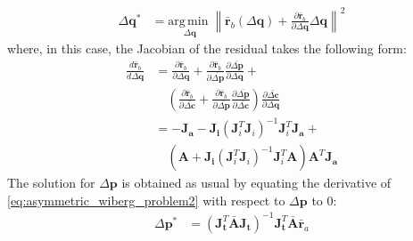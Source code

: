 \begin{equation}
    \begin{aligned}
        \Delta\mathbf{q}^* & = \underset{\Delta\mathbf{q}}{\mathrm{arg\,min\;}}  \left\| \bar{\mathbf{r}}_b(\Delta\mathbf{q}) + \frac{\partial \bar{\mathbf{r}}_b}{\partial\Delta\mathbf{q}} \Delta\mathbf{q} \right\|^2
    \label{eq:bidirectional_wiberg_problem2}
    \end{aligned}
\end{equation}
where, in this case, the Jacobian of the residual takes the following form:
\begin{equation}
    \begin{aligned}
        \frac{d \bar{\mathbf{r}}_b}{d \Delta \mathbf{q}} & = \frac{\partial \bar{\mathbf{r}}_b}{\partial \Delta \mathbf{q}} + \frac{\partial \bar{\mathbf{r}}_b}{\partial \bar{\Delta \mathbf{p}}} \frac{\partial \bar{\Delta \mathbf{p}}}{\partial \Delta \mathbf{q}} +
        \\
        & \quad \left( \frac{\partial\bar{\mathbf{r}}_b}{\partial \bar{\Delta \mathbf{c}}} + \frac{\partial \bar{\mathbf{r}}_b}{\partial \bar{\Delta \mathbf{p}}} \frac{\partial \bar{\Delta \mathbf{p}}}{\partial \bar{\Delta \mathbf{c}}} \right) \frac{\partial \bar{\Delta \mathbf{c}}}{\partial \Delta \mathbf{q}}
        \\
        & = - \mathbf{J}_{\mathbf{a}} - \mathbf{J}_{\mathbf{i}} \left( \mathbf{J}_i^T \mathbf{J}_i \right)^{-1} \mathbf{J}_i^T \mathbf{J}_{\mathbf{a}} +
        \\
        & \quad \left(\mathbf{A} + \mathbf{J}_{\mathbf{i}} \left( \mathbf{J}_i^T \mathbf{J}_i \right)^{-1} \mathbf{J}_i^T \mathbf{A} \right) \mathbf{A}^T \mathbf{J}_{\mathbf{a}}
    \label{eq:bidirectional_wiberg_jacobian}
    \end{aligned}
\end{equation}
 The solution for $\Delta\mathbf{p}$ is obtained as usual by equating the derivative of \ref{eq:asymmetric_wiberg_problem2} with respect to $\Delta\mathbf{p}$ to 0:
 \begin{equation}
    \begin{aligned}
    	\Delta \mathbf{p}^* & = \left( \mathbf{J}_{\mathbf{t}}^T \bar{\mathbf{A}} \mathbf{J}_{\mathbf{t}} \right)^{-1} \mathbf{J}_{\mathbf{t}}^T \bar{\mathbf{A}} \bar{\mathbf{r}}_a
    \label{eq:asymmetric_wiberg_solution}
    \end{aligned}
\end{equation}





